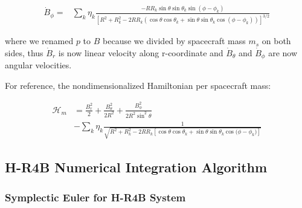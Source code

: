 \begin{equation} \tag{2.88}
    \boxed{
        \!\begin{aligned}
            \dot{B}_\phi = &\sum\limits_{k} \eta_k \frac{- R R_k \sin{\theta}\sin{\theta_k}\sin{(\phi - \phi_k)}}{\left[R^2 + R_k^2 - 2 R R_k \left(\cos{\theta}\cos{\theta_k} + \sin{\theta}\sin{\theta_k}\cos{(\phi - \phi_k)} \right) \right]^{3/2}}
        \end{aligned}
    }
\end{equation}

\vspace{0.2cm}
where we renamed $p$ to $B$ because we divided by spacecraft mass $m_s$ on both sides, thus $\dot{B}_r$ is now linear velocity along r-coordinate and $\dot{B}_\theta$ and $\dot{B}_\phi$ are now angular velocities.

For reference, the nondimensionalized Hamiltonian per spacecraft mass:

\begin{equation} \tag{2.105}
    \begin{aligned}
        \mathcal{H}_m &= \frac{B_r^2}{2} + \frac{B_\theta^2}{2 R^2} + \frac{B_\phi^2}{2 R^2 \sin^2{\theta}} \\
        &- \sum\limits_{k} \eta_k \frac{1}{\sqrt{R^2 + R_k^2 - 2 R R_k \left[\cos{\theta}\cos{\theta_k}+\sin{\theta}\sin{\theta_k}\cos{(\phi - \phi_k})\right]}}        
    \end{aligned}
\end{equation}

\subsection{H-R4B Numerical Integration Algorithm}

\subsubsection{Symplectic Euler for H-R4B System}

